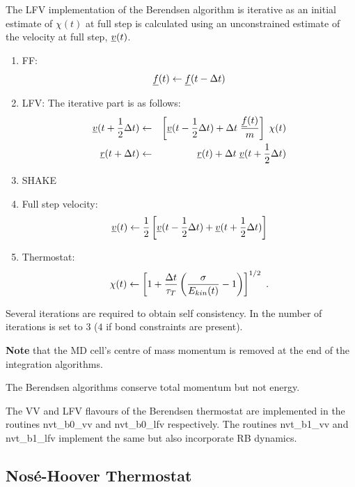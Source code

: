The LFV implementation of the Berendsen algorithm is iterative as an
initial estimate of $\chi (t)$ at full step is calculated using an
unconstrained estimate of the velocity at full step, $\mbox{$\underline{v}$}(t)$.
\begin{enumerate}
\item FF:
\begin{equation}
\mbox{$\underline{f}$}(t) \leftarrow \mbox{$\underline{f}$}(t - \Delta t)
\end{equation}
\item LFV: The iterative part is as follows:
\begin{eqnarray}
\mbox{$\underline{v}$}(t + {1 \over 2} \Delta t) &\leftarrow& \left[ \mbox{$\underline{v}$}(t -
{1 \over 2} \Delta t) + \Delta t \; {\mbox{$\underline{f}$}(t) \over m} \right] \;
\chi (t) \nonumber \\
\mbox{$\underline{r}$}(t + \Delta t) &\leftarrow& \mbox{$\underline{r}$}(t) + \Delta t \;
\mbox{$\underline{v}$}(t + {1 \over 2} \Delta t)
\end{eqnarray}
\item SHAKE
\item Full step velocity:
\begin{equation}
\mbox{$\underline{v}$}(t) \leftarrow {1 \over 2} \left[ \mbox{$\underline{v}$}(t - {1 \over 2} \Delta t) +
\mbox{$\underline{v}$}(t + {1 \over 2} \Delta t) \right]
\end{equation}
\item Thermostat:
\begin{equation}
\chi (t) \leftarrow \left[ 1 + {\Delta t \over \tau_{T}} \left(
{\sigma \over E_{kin}(t)} - 1 \right) \right]^{1/2}~.
\end{equation}
\end{enumerate}
Several iterations are required to obtain self consistency.  In \D
the number of iterations is set to $3$ ($4$ if bond constraints
are present).

{\bf Note} that the MD cell's centre of mass momentum is removed
at the end of the integration algorithms.

The Berendsen algorithms conserve total momentum but not energy.

The VV and LFV flavours of the Berendsen thermostat are implemented in
the \D routines {\sc nvt\_b0\_vv} and {\sc nvt\_b0\_lfv} respectively.
The routines {\sc nvt\_b1\_vv} and {\sc nvt\_b1\_lfv} implement the
same but also incorporate RB dynamics.

\subsection{Nos\'e-Hoover Thermostat}

